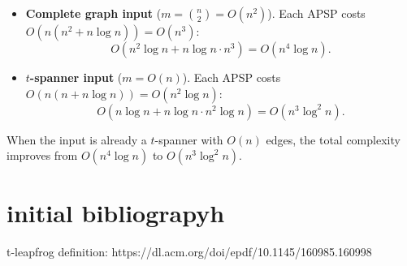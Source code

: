 \documentclass{article}
\begin{document}
\begin{itemize}
    \item \textbf{Complete graph input} ($m = \binom{n}{2} = O(n^2)$).
    Each APSP costs $O(n(n^2 + n \log n)) = O(n^3)$:
    \[
        O(n^2 \log n + n \log n \cdot n^3) = O(n^4 \log n).
    \]

    \item \textbf{$t$-spanner input} ($m = O(n)$).
    Each APSP costs $O(n(n + n \log n)) = O(n^2 \log n)$:
    \[
        O(n \log n + n \log n \cdot n^2 \log n) = O(n^3 \log^2 n).
    \]
\end{itemize}

\noindent When the input is already a $t$-spanner with $O(n)$ edges, the total complexity improves from $O(n^4 \log n)$ to $O(n^3 \log^2 n)$.


\section{initial bibliograpyh}

t-leapfrog definition: https://dl.acm.org/doi/epdf/10.1145/160985.160998
\end{document}
